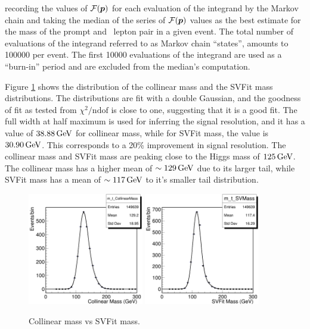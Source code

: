recording the values of $\mathcal{F}(\boldsymbol{p})$ for each evaluation of the integrand by the Markov chain and taking the median of the series of $\mathcal{F}(\boldsymbol{p})$ values as the best estimate \mlt for the mass of the prompt and \Pgt\, lepton pair in a given event. The total number of evaluations of the integrand referred to as Markov chain ``states'', amounts to 100000 per event. The first 10000 evaluations of the integrand are used as a ``burn-in'' period and are excluded from the median's computation.

Figure \ref{fig:svfit} shows the distribution of the collinear mass and the SVFit mass distributions. The distributions are fit with a double Gaussian, and the goodness of fit as tested from $\chi^2/\text{ndof}$ is close to one, suggesting that it is a good fit. The full width at half maximum is used for inferring the signal resolution, and it has a value of $38.88 \,\text{Ge\hspace{-.08em}V}$ for collinear mass, while for SVFit mass, the value is $30.90 \,\text{Ge\hspace{-.08em}V}$. This corresponds to a 20\% improvement in signal resolution. The collinear mass and SVFit mass are peaking close to the Higgs mass of $125 \,\text{Ge\hspace{-.08em}V}$. The collinear mass has a higher mean of $\sim 129 \,\text{Ge\hspace{-.08em}V}$ due to its larger tail, while SVFit mass has a mean of $\sim 117 \,\text{Ge\hspace{-.08em}V}$ to it's smaller tail distribution.

\begin{figure}[!htpb]
  \centering
  \includegraphics[width=0.45\textwidth]{plots/appendix/CollMass.png}
  \includegraphics[width=0.45\textwidth]{plots/appendix/SVFit.png}
  \caption{Collinear mass vs SVFit mass.}
  \label{fig:svfit}
\end{figure}

